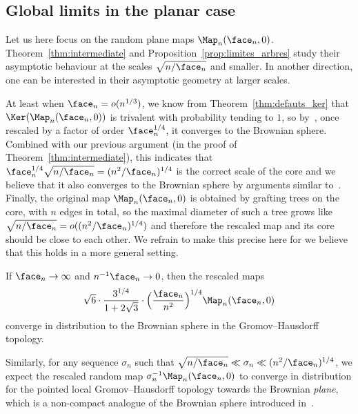 \subsection{Global limits in the planar case}
\label{ssec:TBM}

Let us here focus on the random plane maps $\Map_n(\face_n, 0)$. Theorem~\ref{thm:intermediate} and Proposition~\ref{prop:limites_arbres} study their asymptotic behaviour at the scales $\sqrt{n/\face_n}$ and smaller.
In another direction, one can be interested in their asymptotic geometry at larger scales.

At least when $\face_n = o(n^{1/3})$, we know from Theorem~\ref{thm:defauts_ker} that $\Ker(\Map_n(\face_n, 0))$ is trivalent with probability tending to $1$, so by~\cite[Cor.\,23]{CLG19}, once rescaled by a factor of order $\face_n^{1/4}$, it converges to the Brownian sphere. Combined with our previous argument (\eg in the proof of Theorem~\ref{thm:intermediate}), this indicates that $\face_n^{1/4} \sqrt{n/ \face_n} = (n^2/\face_n)^{1/4}$ is the correct scale of the core and we believe that it also converges to the Brownian sphere by arguments similar to~\cite{CLG19}. Finally, the original map $\Map_n(\face_n, 0)$ is obtained by grafting trees on the core, with $n$ edges in total, so the maximal diameter of such a tree grows like
$
\sqrt{n/\face_n} = o((n^2/\face_n)^{1/4})$ and therefore the rescaled map and its core should be close to each other.
We refrain to make this precise here for we believe that this holds in a more general setting.

\begin{conjecture}\label{conjecture}
If $\face_n \to \infty$ and $n^{-1} \face_n \to 0$, then the rescaled maps
\[
\sqrt{6} \cdot \frac{3^{1/4}}{1+2\sqrt{3}} \cdot \Bigl(\frac{\face_n}{n^2}\Bigr)^{1/4} \Map_n(\face_n, 0)
\]
converge in distribution to the Brownian sphere in the Gromov--Hausdorff topology.
\end{conjecture}

Similarly, for any sequence $\sigma_n$ such that $\sqrt{n/\face_n} \ll \sigma_n \ll (n^2/\face_n)^{1/4}$, we expect the rescaled random map $\sigma_n^{-1} \Map_n(\face_{n},0)$ to converge in distribution for the pointed local Gromov--Hausdorff topology towards the Brownian \emph{plane}, which is a non-compact analogue of the Brownian sphere introduced in~\cite{CLG14}.

